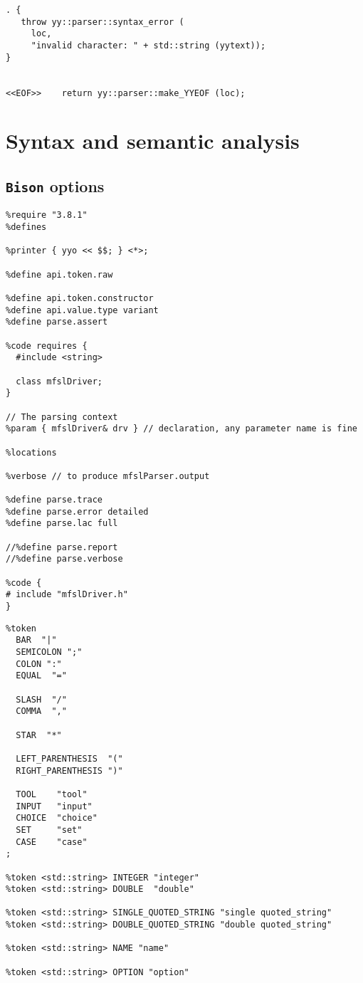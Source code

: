 \begin{lstlisting}[language=Flex]
. {
   throw yy::parser::syntax_error (
     loc,
     "invalid character: " + std::string (yytext));
}


<<EOF>>    return yy::parser::make_YYEOF (loc);
\end{lstlisting}


\section{Syntax and semantic analysis}


\subsection{{\tt Bison} options}

\begin{lstlisting}[language=Bison]
%skeleton "lalr1.cc" // -*- C++ -*-
%require "3.8.1"
%defines

%printer { yyo << $$; } <*>;

%define api.token.raw

%define api.token.constructor
%define api.value.type variant
%define parse.assert

%code requires {
  #include <string>

  class mfslDriver;
}

// The parsing context
%param { mfslDriver& drv } // declaration, any parameter name is fine

%locations

%verbose // to produce mfslParser.output

%define parse.trace
%define parse.error detailed
%define parse.lac full

//%define parse.report
//%define parse.verbose

%code {
# include "mfslDriver.h"
}
\end{lstlisting}

\begin{lstlisting}[language=Bison]
%define api.token.prefix {TOK_}
%token
  BAR  "|"
  SEMICOLON ";"
  COLON ":"
  EQUAL  "="

  SLASH  "/"
  COMMA  ","

  STAR  "*"

  LEFT_PARENTHESIS  "("
  RIGHT_PARENTHESIS ")"

  TOOL    "tool"
  INPUT   "input"
  CHOICE  "choice"
  SET     "set"
  CASE    "case"
;

%token <std::string> INTEGER "integer"
%token <std::string> DOUBLE  "double"

%token <std::string> SINGLE_QUOTED_STRING "single quoted_string"
%token <std::string> DOUBLE_QUOTED_STRING "double quoted_string"

%token <std::string> NAME "name"

%token <std::string> OPTION "option"
\end{lstlisting}


